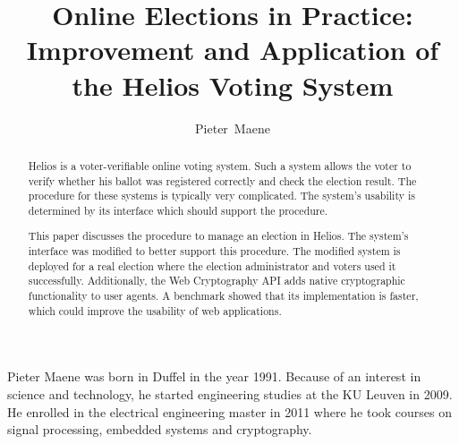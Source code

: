\documentclass[a4paper,journal]{IEEEtran}
\begin{document}
  
  

  \title{Online Elections in Practice: Improvement and Application of the Helios Voting System}
  \author{Pieter~Maene}

  \maketitle
  
  \begin{abstract}    
    Helios is a voter-verifiable online voting system. Such a system allows the voter to verify whether his ballot was registered correctly and check the election result. The procedure for these systems is typically very complicated. The system's usability is determined by its interface which should support the procedure.
    
    \par This paper discusses the procedure to manage an election in Helios. The system's interface was modified to better support this procedure. The modified system is deployed for a real election where the election administrator and voters used it successfully. Additionally, the Web Cryptography API adds native cryptographic functionality to user agents. A benchmark showed that its implementation is faster, which could improve the usability of web applications.
  \end{abstract}
  
  
  
  
  
  
  
  
  
  

  \begin{IEEEbiography}{Pieter Maene} was born in Duffel in the year 1991. Because of an interest in science and technology, he started engineering studies at the KU Leuven in 2009. He enrolled in the electrical engineering master in 2011 where he took courses on signal processing, embedded systems and cryptography.
  \end{IEEEbiography}
\end{document}
